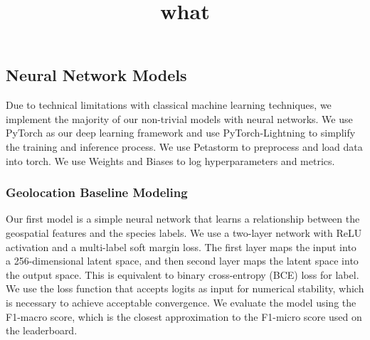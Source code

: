 \subsection{Neural Network Models}

Due to technical limitations with classical machine learning techniques, we implement the majority of our non-trivial models with neural networks.
We use PyTorch as our deep learning framework and use PyTorch-Lightning to simplify the training and inference process.
We use Petastorm to preprocess and load data into torch.
We use Weights and Biases to log hyperparameters and metrics.

\begin{table}[]
\title{what}
\caption{}
\label{tab:experiments}
\end{table}

\subsubsection{Geolocation Baseline Modeling}

Our first model is a simple neural network that learns a relationship between the geospatial features and the species labels.
We use a two-layer network with ReLU activation and a multi-label soft margin loss.
The first layer maps the input into a 256-dimensional latent space, and then second layer maps the latent space into the output space.
This is equivalent to binary cross-entropy (BCE) loss for label.
We use the loss function that accepts logits as input for numerical stability, which is necessary to achieve acceptable convergence.
We evaluate the model using the F1-macro score, which is the closest approximation to the F1-micro score used on the leaderboard.

